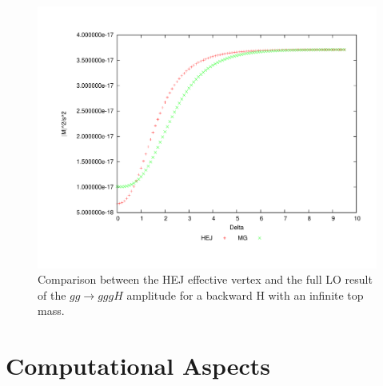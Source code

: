 \begin{figure}[H]
\centering
\includegraphics[scale=0.43]{Images/gg_nextback.pdf}
\caption{Comparison between the HEJ effective vertex and the full LO result of the $gg \to gggH$ amplitude for a backward H with an infinite top mass.}
\label{fig:gg_ggh_4}
\end{figure}

\section{Computational Aspects}

